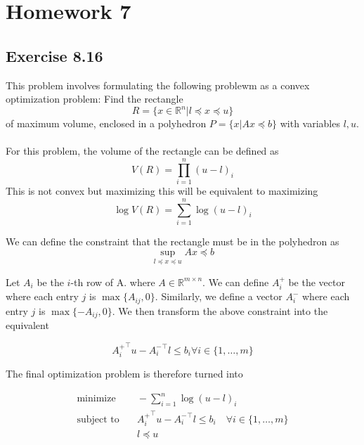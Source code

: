 \section{Homework 7}

\subsection{Exercise 8.16}
This problem involves formulating the following problewm as a convex optimization problem: Find the rectangle
\begin{equation}
    R = \{ x \in \mathbb{R}^n | l \preceq x \preceq u  \}
\end{equation}
of maximum volume, enclosed in a polyhedron $P = \{ x | Ax \preceq b \}$ with variables $l, u$.
\\ \\
For this problem, the volume of the rectangle can be defined as 
\begin{equation}
    V(R) = \prod_{i=1}^{n} (u-l)_i
\end{equation}
This is not convex but maximizing this will be equivalent to maximizing
\begin{equation}
    \log V(R) = \sum_{i=1}^n \log (u - l)_i
\end{equation}

We can define the constraint that the rectangle must be in the polyhedron as
\begin{equation}
    \sup_{ l \preceq x \preceq u} Ax  \preceq b 
\end{equation}

Let $A_i$ be the  $i$-th row of A. where $A \in \mathbb{R}^{m \times n}$. We can define $A_i^+$ be the vector where each entry $j$ is $\max\{A_{ij}, 0\}$. Similarly, we define a vector $A_{i}^-$ where each entry $j$ is $\max\{ -A_{ij},0 \}$. We then transform the above constraint into the equivalent

\begin{equation}
    {A_i^+}^\top u - {A_i^-}^\top l \leq b_i \forall i \in \{ 1,\dots, m \}
\end{equation}

The final optimization problem is therefore turned into

\begin{align}
  \text{minimize} & \quad - \sum_{i=1}^n \log(u - l)_i \\
  \text{subject to} & \quad {A_i^+}^\top u - {A_i^-}^\top l \leq b_i \quad \forall i \in \{ 1,\dots, m \} \\
  & \quad l \preceq u
\end{align}

